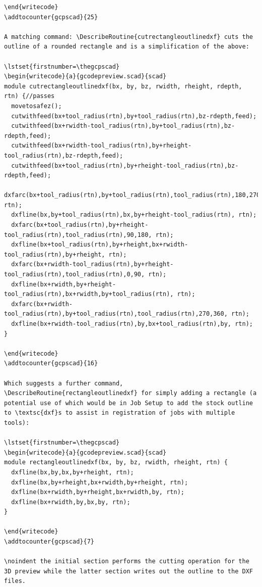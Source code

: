 \documentclass{ltxdoc}
\begin{document}
\begin{verbatim}
\end{writecode}
\addtocounter{gcpscad}{25}

A matching command: \DescribeRoutine{cutrectangleoutlinedxf} cuts the outline of a rounded rectangle and is a simplification of the above:

\lstset{firstnumber=\thegcpscad}
\begin{writecode}{a}{gcodepreview.scad}{scad}
module cutrectangleoutlinedxf(bx, by, bz, rwidth, rheight, rdepth, rtn) {//passes
  movetosafez();
  cutwithfeed(bx+tool_radius(rtn),by+tool_radius(rtn),bz-rdepth,feed);
  cutwithfeed(bx+rwidth-tool_radius(rtn),by+tool_radius(rtn),bz-rdepth,feed);
  cutwithfeed(bx+rwidth-tool_radius(rtn),by+rheight-tool_radius(rtn),bz-rdepth,feed);
  cutwithfeed(bx+tool_radius(rtn),by+rheight-tool_radius(rtn),bz-rdepth,feed);
  dxfarc(bx+tool_radius(rtn),by+tool_radius(rtn),tool_radius(rtn),180,270, rtn);
  dxfline(bx,by+tool_radius(rtn),bx,by+rheight-tool_radius(rtn), rtn);
  dxfarc(bx+tool_radius(rtn),by+rheight-tool_radius(rtn),tool_radius(rtn),90,180, rtn);
  dxfline(bx+tool_radius(rtn),by+rheight,bx+rwidth-tool_radius(rtn),by+rheight, rtn);
  dxfarc(bx+rwidth-tool_radius(rtn),by+rheight-tool_radius(rtn),tool_radius(rtn),0,90, rtn);
  dxfline(bx+rwidth,by+rheight-tool_radius(rtn),bx+rwidth,by+tool_radius(rtn), rtn);
  dxfarc(bx+rwidth-tool_radius(rtn),by+tool_radius(rtn),tool_radius(rtn),270,360, rtn);
  dxfline(bx+rwidth-tool_radius(rtn),by,bx+tool_radius(rtn),by, rtn);
}

\end{writecode}
\addtocounter{gcpscad}{16}

Which suggests a further command, \DescribeRoutine{rectangleoutlinedxf} for simply adding a rectangle (a potential use of which would be in Job Setup to add the stock outline to \textsc{dxf}s to assist in registration of jobs with multiple tools):

\lstset{firstnumber=\thegcpscad}
\begin{writecode}{a}{gcodepreview.scad}{scad}
module rectangleoutlinedxf(bx, by, bz, rwidth, rheight, rtn) {
  dxfline(bx,by,bx,by+rheight, rtn);
  dxfline(bx,by+rheight,bx+rwidth,by+rheight, rtn);
  dxfline(bx+rwidth,by+rheight,bx+rwidth,by, rtn);
  dxfline(bx+rwidth,by,bx,by, rtn);
}

\end{writecode}
\addtocounter{gcpscad}{7}

\noindent the initial section performs the cutting operation for the 3D preview while the latter section writes out the outline to the DXF files.


\end{verbatim}
\end{document}
